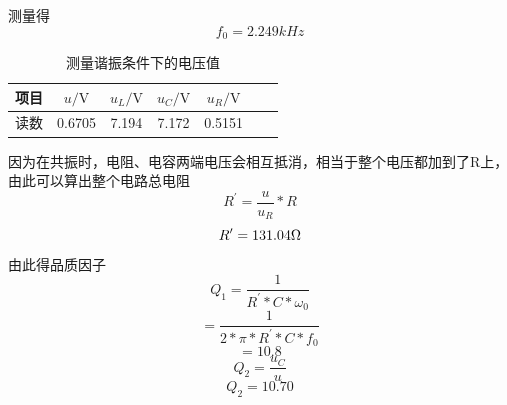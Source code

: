 \documentclass[a4paper,11pt]{article}
\begin{document}
	测量得$$ f_{0} = 2.249 kHz $$
	
	\begin{table}[H]
		\centering\caption{测量谐振条件下的电压值}
		\small
		\begin{tabularx}{.85\linewidth}{C{1} *6{C{.8}}}
			\toprule
			\textbf{项目} &
			$u / \si{\V}$ &
			$u_{L}/ \si{\V}$ &
			$u_{C} / \si{\V}$ &
			$u_{R} / \si{\V}$ & \\
			\midrule
			读数     & 0.6705  & 7.194  & 7.172 & 0.5151 &   \\
			\bottomrule
		\end{tabularx}
		\vspace{3ex}
	\end{table}\noindent%

    因为在共振时，电阻、电容两端电压会相互抵消，相当于整个电压都加到了R上，由此可以算出整个电路总电阻$$ R^{\prime} = \frac{u}{u_{R}} * R $$
	$$ R^{\prime} = 131.04 \ohm $$
	由此得品质因子
	$$ Q_{1} = \dfrac{1}{R^{\prime} * C * \omega_{0}} $$
	$$  = \dfrac{1}{ 2* \pi * R^{\prime} * C * f_{0}} $$
	$$  = 10.8 $$
	$$ Q_{2} = \dfrac{u_{C}}{u} $$
	$$ Q_{2} = 10.70 $$
\end{document}
